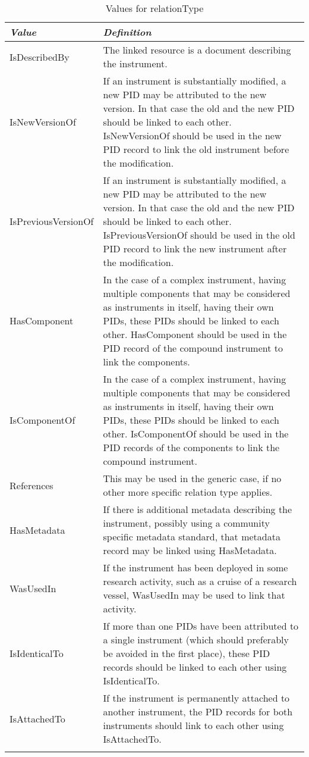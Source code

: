 \documentclass[titlepage=true,twoside=false,DIV=13]{scrartcl}
\begin{document}
\begin{longtable}{|l|p{\valdefcolw}|}
  \hline
  \emph{Value} & \emph{Definition} \\
  \hline \endhead
  \hline \endfoot\endlastfoot
  IsDescribedBy       &
  The linked resource is a document describing the instrument.
  \\ \hline
  IsNewVersionOf      &
  If an instrument is substantially modified, a new PID may be
  attributed to the new version.  In that case the old and the new PID
  should be linked to each other.  IsNewVersionOf should be used in
  the new PID record to link the old instrument before the
  modification.
  \\ \hline
  IsPreviousVersionOf &
  If an instrument is substantially modified, a new PID may be
  attributed to the new version.  In that case the old and the new PID
  should be linked to each other.  IsPreviousVersionOf should be used
  in the old PID record to link the new instrument after the
  modification.
  \\ \hline
  HasComponent        &
  In the case of a complex instrument, having multiple components that
  may be considered as instruments in itself, having their own PIDs,
  these PIDs should be linked to each other.  HasComponent should be
  used in the PID record of the compound instrument to link the
  components.
  \\ \hline
  IsComponentOf       &
  In the case of a complex instrument, having multiple components that
  may be considered as instruments in itself, having their own PIDs,
  these PIDs should be linked to each other.  IsComponentOf should be
  used in the PID records of the components to link the compound
  instrument.
  \\ \hline
  References          &
  This may be used in the generic case, if no other more specific
  relation type applies.
  \\ \hline
  HasMetadata         &
  If there is additional metadata describing the instrument, possibly
  using a community specific metadata standard, that metadata record
  may be linked using HasMetadata.
  \\ \hline
  WasUsedIn           &
  If the instrument has been deployed in some research activity, such
  as a cruise of a research vessel, WasUsedIn may be used to link that
  activity.
  \\ \hline
  IsIdenticalTo       &
  If more than one PIDs have been attributed to a single instrument
  (which should preferably be avoided in the first place), these PID
  records should be linked to each other using IsIdenticalTo.
  \\ \hline
  IsAttachedTo        &
  If the instrument is permanently attached to another instrument, the
  PID records for both instruments should link to each other using
  IsAttachedTo.
  \\ \hline
  \caption{Values for relationType}
  \label{tab:schema:values:relationType}
\end{longtable}
\end{document}
